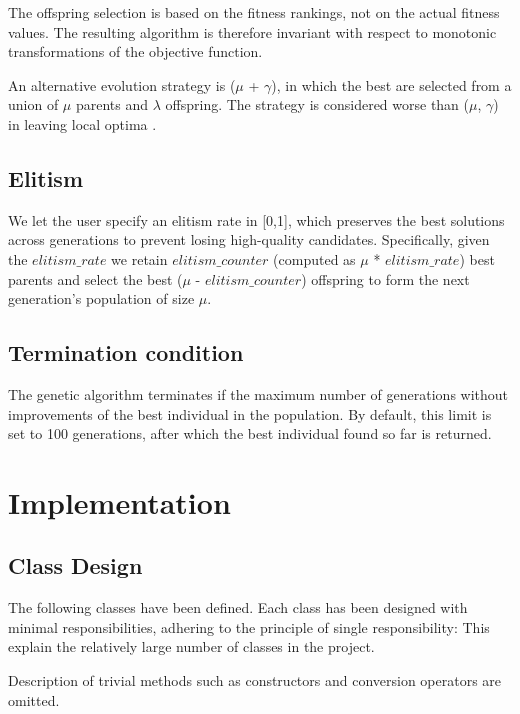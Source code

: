 \documentclass[../main.tex]{subfiles}
\begin{document}
The offspring selection is based on the fitness rankings, not on the actual fitness values. The resulting algorithm is therefore invariant with respect to monotonic transformations of the objective function. 

An alternative evolution strategy is ($\mu$ + $\gamma$), in which the best are selected from a union of $\mu$ parents and $\lambda$ offspring. The strategy is considered worse than ($\mu$, $\gamma$) in leaving local optima \cite{oslobioinspired}.
\subsection{Elitism}
We let the user specify an elitism rate in [0,1], which preserves the best solutions across generations to prevent losing high-quality candidates. Specifically, given the $elitism\_rate$ we retain $elitism\_counter$ (computed as $\mu$ * $elitism\_rate$) best parents and select the best ($\mu$ - $elitism\_counter$) offspring to form the next generation's population of size $\mu$.
\subsection{Termination condition}  
The genetic algorithm terminates if the maximum number of generations without improvements of the best individual in the population. By default, this limit is set to 100 generations, after which the best individual found so far is returned.
\section{Implementation}
\subsection{Class Design}

The following classes have been defined. Each class has been designed with minimal responsibilities, adhering to the principle of single responsibility: This explain the relatively large number of classes in the project.

Description of trivial methods such as constructors and conversion operators are omitted.
\end{document}
